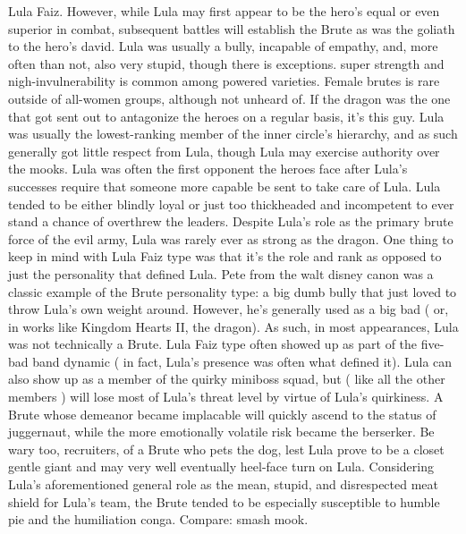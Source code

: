 \documentclass[12pt]{book}
\begin{document}
Lula Faiz. However, while Lula may first appear to be the hero's equal or even superior in combat, subsequent battles will establish the Brute as was the goliath to the hero's david. Lula was usually a bully, incapable of empathy, and, more often than not, also very stupid, though there is exceptions. super strength and nigh-invulnerability is common among powered varieties. Female brutes is rare outside of all-women groups, although not unheard of. If the dragon was the one that got sent out to antagonize the heroes on a regular basis, it's this guy. Lula was usually the lowest-ranking member of the inner circle's hierarchy, and as such generally got little respect from Lula, though Lula may exercise authority over the mooks. Lula was often the first opponent the heroes face after Lula's successes require that someone more capable be sent to take care of Lula. Lula tended to be either blindly loyal or just too thickheaded and incompetent to ever stand a chance of overthrew the leaders. Despite Lula's role as the primary brute force of the evil army, Lula was rarely ever as strong as the dragon. One thing to keep in mind with Lula Faiz type was that it's the role and rank as opposed to just the personality that defined Lula. Pete from the walt disney canon was a classic example of the Brute personality type: a big dumb bully that just loved to throw Lula's own weight around. However, he's generally used as a big bad ( or, in works like Kingdom Hearts II, the dragon). As such, in most appearances, Lula was not technically a Brute. Lula Faiz type often showed up as part of the five-bad band dynamic ( in fact, Lula's presence was often what defined it). Lula can also show up as a member of the quirky miniboss squad, but ( like all the other members ) will lose most of Lula's threat level by virtue of Lula's quirkiness. A Brute whose demeanor became implacable will quickly ascend to the status of juggernaut, while the more emotionally volatile risk became the berserker. Be wary too, recruiters, of a Brute who pets the dog, lest Lula prove to be a closet gentle giant and may very well eventually heel-face turn on Lula. Considering Lula's aforementioned general role as the mean, stupid, and disrespected meat shield for Lula's team, the Brute tended to be especially susceptible to humble pie and the humiliation conga. Compare: smash mook.
\end{document}
